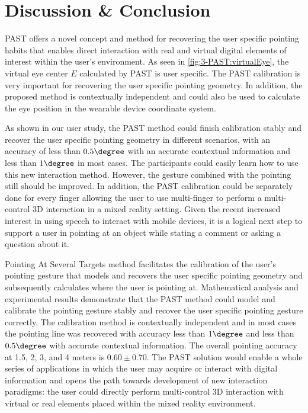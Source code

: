 \section{Discussion \& Conclusion}
PAST offers a novel concept and method for recovering the user specific pointing habits that enables direct interaction with real and virtual digital elements of interest within the user's environment. 
As seen in \figurename{ \ref{fig:3-PAST:virtualEye}}, the virtual eye center $E$ calculated by PAST is user specific. The PAST calibration is very important for recovering the user specific pointing geometry. In addition, the proposed method is contextually independent and could also be used to calculate the eye position in the wearable device coordinate system. 

As shown in our user study, the PAST method could finish calibration stably and recover the user specific pointing geometry in different scenarios, with an accuracy of less than $0.5\degree$ with an accurate contextual information and less than $1\degree$ in most cases. The participants could easily learn how to use this new interaction method. However, the gesture combined with the pointing still should be improved. In addition, the PAST calibration could be separately done for every  finger allowing the user to use multi-finger to perform a multi-control 3D interaction in a mixed reality setting. Given the recent increased interest in using speech to interact with mobile devices, it is a logical next step to support a user in pointing at an object while stating a comment or asking a question about it.

Pointing At Several Targets method facilitates the calibration of the user's pointing gesture that models and recovers the user specific pointing geometry and subsequently calculates where the user is pointing at. Mathematical analysis and experimental results demonstrate that the PAST method could model and calibrate the pointing gesture stably and recover the user specific pointing gesture correctly. The calibration method is contextually independent and in most cases the pointing line was recovered with accuracy less than $1\degree$ and less than $0.5\degree$ with accurate contextual information. The overall pointing accuracy at 1.5, 2, 3, and 4 meters is $0.60\pm0.70$\degree. The PAST solution would enable a whole series of applications in which the user may acquire or interact with digital information and opens the path towards development of new interaction paradigms: the user could directly perform multi-control 3D interaction with virtual or real elements placed within the mixed reality environment.